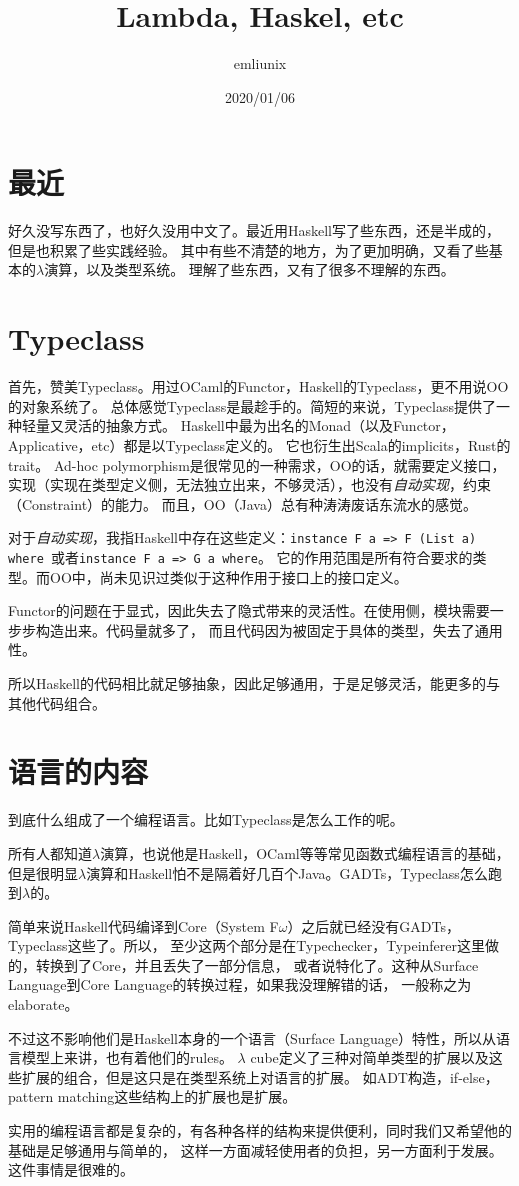 \documentclass{article}
\author{emliunix}
\title{Lambda, Haskel, etc}
\date{2020/01/06}
\begin{document}
\maketitle

\section*{最近}

好久没写东西了，也好久没用中文了。最近用Haskell写了些东西，还是半成的，但是也积累了些实践经验。
其中有些不清楚的地方，为了更加明确，又看了些基本的$\lambda$演算，以及类型系统。
理解了些东西，又有了很多不理解的东西。

\section*{Typeclass}

首先，赞美Typeclass。用过OCaml的Functor，Haskell的Typeclass，更不用说OO的对象系统了。
总体感觉Typeclass是最趁手的。简短的来说，Typeclass提供了一种轻量又灵活的抽象方式。
Haskell中最为出名的Monad（以及Functor，Applicative，etc）都是以Typeclass定义的。
它也衍生出Scala的implicits，Rust的trait。
Ad-hoc polymorphism是很常见的一种需求，OO的话，就需要定义接口，
实现（实现在类型定义侧，无法独立出来，不够灵活），也没有\emph{自动实现}，约束（Constraint）的能力。
而且，OO（Java）总有种涛涛废话东流水的感觉。

对于\emph{自动实现}，我指Haskell中存在这些定义：{\tt instance F a => F (List a) where }或者{\tt instance F a => G a where}。
它的作用范围是所有符合要求的类型。而OO中，尚未见识过类似于这种作用于接口上的接口定义。

Functor的问题在于显式，因此失去了隐式带来的灵活性。在使用侧，模块需要一步步构造出来。代码量就多了，
而且代码因为被固定于具体的类型，失去了通用性。

所以Haskell的代码相比就足够抽象，因此足够通用，于是足够灵活，能更多的与其他代码组合。

\section*{语言的内容}

到底什么组成了一个编程语言。比如Typeclass是怎么工作的呢。

所有人都知道$\lambda$演算，也说他是Haskell，OCaml等等常见函数式编程语言的基础，
但是很明显$\lambda$演算和Haskell怕不是隔着好几百个Java。GADTs，Typeclass怎么跑到$\lambda$的。

简单来说Haskell代码编译到Core（System F$\omega$）之后就已经没有GADTs，Typeclass这些了。所以，
至少这两个部分是在Typechecker，Typeinferer这里做的，转换到了Core，并且丢失了一部分信息，
或者说特化了。这种从Surface Language到Core Language的转换过程，如果我没理解错的话，
一般称之为elaborate。

不过这不影响他们是Haskell本身的一个语言（Surface Language）特性，所以从语言模型上来讲，也有着他们的rules。
$\lambda$ cube定义了三种对简单类型的扩展以及这些扩展的组合，但是这只是在类型系统上对语言的扩展。
如ADT构造，if-else，pattern matching这些结构上的扩展也是扩展。

实用的编程语言都是复杂的，有各种各样的结构来提供便利，同时我们又希望他的基础是足够通用与简单的，
这样一方面减轻使用者的负担，另一方面利于发展。这件事情是很难的。
\end{document}
